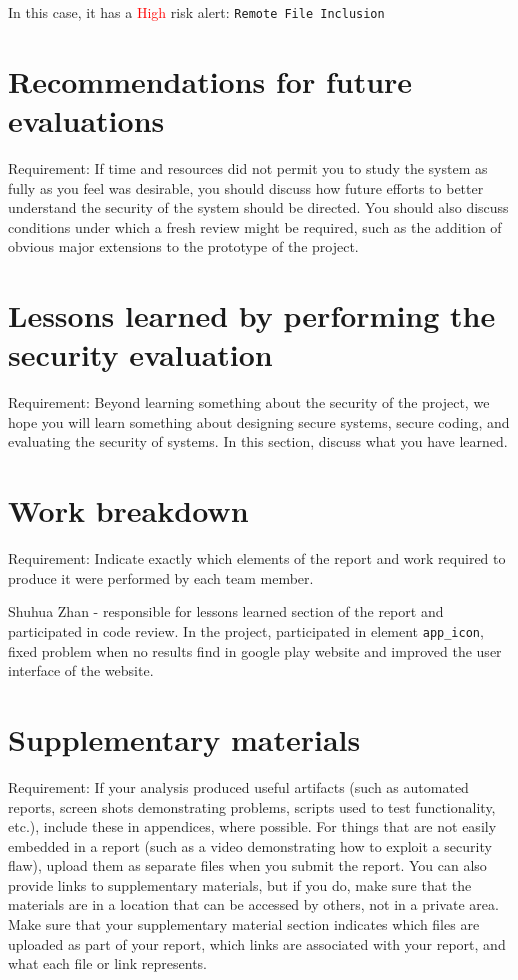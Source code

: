 \documentclass[12pt, a4paper]{article}
\newcommand{\code}[1]{\texttt{#1}}
\begin{document}
In this case, it has a \textcolor{red}{High} risk alert: \code{Remote File Inclusion}










\section{Recommendations for future evaluations}

Requirement: If time and resources did not permit you to study the system as fully as you feel was desirable, you should discuss how future efforts to better understand the security of the system should be directed. You should also discuss conditions under which a fresh review might be required, such as the addition of obvious major extensions to the prototype of the project. 

\section{Lessons learned by performing the security evaluation}

Requirement: Beyond learning something about the security of the project, we hope you will learn something about designing secure systems, secure coding, and evaluating the security of systems. In this section, discuss what you have learned.  

\section{Work breakdown}

Requirement:  Indicate exactly which elements of the report and work required to produce it were performed by each team member. 

Shuhua Zhan - responsible for lessons learned section of the report and participated in code review. In the project, participated in element \code{app\_icon}, fixed problem when no results find in google play website and improved the user interface of the website.

\section{Supplementary materials}

Requirement: If your analysis produced useful artifacts (such as automated reports, screen shots demonstrating problems, scripts used to test functionality, etc.), include these in appendices, where possible. For things that are not easily embedded in a 
report (such as a video demonstrating how to exploit a security flaw), upload them as separate files when you submit the report. You can also provide links to supplementary materials, but if you do, make sure that the materials are in a location that can be accessed by others, not in a private area. Make sure that your supplementary material section indicates which files are uploaded as part of your report, which links are associated with your report, and what each file or link represents.  
 
\end{document}
